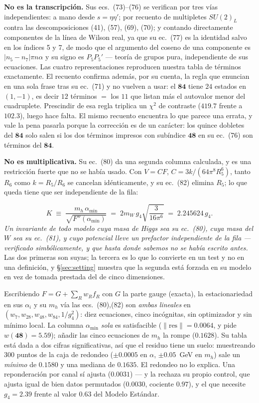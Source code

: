 \documentclass[11pt,a4paper]{article}
\newcommand{\su}[1]{SU(#1)}
\newcommand{\rep}[1]{\mathbf{#1}}
\newcommand{\amin}{\alpha_{\min}}
\newenvironment{keyeq}
  {\begin{center}\setlength{\fboxsep}{9pt}\setlength{\fboxrule}{0.8pt}%
   \begin{lrbox}{\keyeqbox}\begin{minipage}{0.88\textwidth}}
  {\end{minipage}\end{lrbox}%
   \fcolorbox{hdrblue!55}{hdrblue!6}{\usebox{\keyeqbox}}\end{center}}
\begin{document}
\textbf{No es la transcripción.} Sus ecs.~(73)--(76) se verifican por tres vías independientes: a
mano desde $s=\eta\eta'$; por recuento de multipletes $\su2_L$ contra las descomposiciones (41),
(57), (69), (70); y contando directamente componentes de la línea de Wilson real, ya que su ec.~(77)
es la identidad salvo en los índices 5 y 7, de modo que el argumento del coseno de una componente es
$|n_5-n_7|\pi n\alpha$ y su signo es $P_5P_5'$ --- teoría de grupos pura, independiente de sus
ecuaciones. Las cuatro representaciones reproducen nuestra tabla de términos exactamente. El recuento
confirma además, por su cuenta, la regla que enuncian en una sola frase tras su ec.~(71) y no vuelven
a usar: el $\rep{84}$ tiene $24$ estados en $(1,-1)$, es decir $12$ términos $=$ los $11$ que listan
más el autovalor menor del cuadruplete. Prescindir de esa regla triplica un $\chi^2$ de contraste
($419.7$ frente a $102.3$), luego hace falta. El mismo recuento encuentra lo que parece una errata, y
vale la pena pasarla porque la corrección es de un carácter: los quince
dobletes del $\rep{84}$ solo salen si los dos términos impresos con subíndice $\rep{48}$ en su
ec.~(76) son términos del $\rep{84}$.

\textbf{No es multiplicativa.} Su ec.~(80) da una segunda columna calculada, y es una restricción
fuerte que no se había usado. Con $V=CF$, $C=3k/(64\pi^8R_5^6)$, tanto $R_6$ como $k=R_5/R_6$ se
cancelan idénticamente, y su ec.~(82) elimina $R_5$; lo que queda tiene que ser independiente de la
fila:
\begin{keyeq}
\begin{equation}\label{eq:K}
K\;\equiv\;\frac{m_h\,\amin}{\sqrt{F''(\amin)}}\;=\;2m_W\,g_4\sqrt{\frac{3}{16\pi^6}}\;=\;2.245624\,g_4 .
\end{equation}
\emph{Un invariante de todo modelo cuya masa de Higgs sea su ec.~(80), cuya masa del $W$ sea su
ec.~(81), y cuyo potencial lleve un prefactor independiente de la fila --- verificado simbólicamente,
y que hasta donde sabemos no se había escrito antes.} Las dos primeras son suyas; la tercera es lo
que lo convierte en un test y no en una definición, y \S\ref{sec:setting} muestra que la segunda está
forzada en su modelo en vez de tomada prestada del de cinco dimensiones.
\end{keyeq}
Escribiendo $F=G+\sum_R w_R f_R$ con $G$ la parte gauge (exacta), la estacionariedad en sus
$\alpha_i$ y su $m_h$ vía las ecs.~(80),(82) son \emph{ambas lineales} en
$(w_7,w_{28},w_{48},w_{84},1/g_4^2)$: diez ecuaciones, cinco incógnitas, sin optimizador y sin mínimo
local. La columna $\amin$ \emph{sola} es satisfacible ($\|\mathrm{res}\|=0.0064$, y pide
$w(\rep{48})=5.59$); añadir las cinco ecuaciones de $m_h$ la rompe ($0.1628$). Su tabla está dada a
dos cifras significativas, así que el residuo tiene un suelo: muestreando $300$ puntos de la caja de
redondeo ($\pm0.0005$ en $\alpha$, $\pm0.05$~GeV en $m_h$) sale un \emph{mínimo} de $0.1580$ y una
mediana de $0.1635$. El redondeo no lo explica. Una reponderación por canal sí ajusta ($0.0031$) ---
y la rechaza su propio control, que ajusta igual de bien datos permutados ($0.0030$, cociente
$0.97$), y el que necesite $g_4=2.39$ frente al valor $0.63$ del Modelo Estándar.
\end{document}
